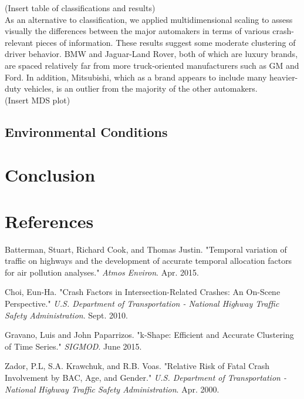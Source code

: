 \documentclass[11pt, oneside]{article}   	%
\begin{document}
(Insert table of classifications and results) \\

As an alternative to classification, we applied multidimensional scaling to assess visually the differences between the major automakers in terms of various crash-relevant pieces of information. These results suggest some moderate clustering of driver behavior. BMW and Jaguar-Land Rover, both of which are luxury brands, are spaced relatively far from more truck-oriented manufacturers such as GM and Ford. In addition, Mitsubishi, which as a brand appears to include many heavier-duty vehicles, is an outlier from the majority of the other automakers.\\

(Insert MDS plot) \\



\subsection*{Environmental Conditions}

\section*{Conclusion}

\section*{References}
\begin{hangparas}{1.27cm}{1}
Batterman, Stuart, Richard Cook, and Thomas Justin. "Temporal variation of traffic on highways and the development of accurate temporal allocation factors for air pollution analyses." \textit{Atmos Environ}. Apr. 2015.

Choi, Eun-Ha. "Crash Factors in Intersection-Related Crashes: An On-Scene Perspective." \textit{U.S. Department of Transportation - National Highway Traffic Safety Administration}. Sept. 2010.

Gravano, Luis and John Paparrizos. "k-Shape: Efficient and Accurate Clustering of Time Series." \textit{SIGMOD}. June 2015.

Zador, P.L, S.A. Krawchuk, and R.B. Voas. "Relative Risk of Fatal Crash Involvement by BAC, Age, and Gender." \textit{U.S. Department of Transportation - National Highway Traffic Safety Administration}. Apr. 2000.




\end{hangparas}
\end{document}
